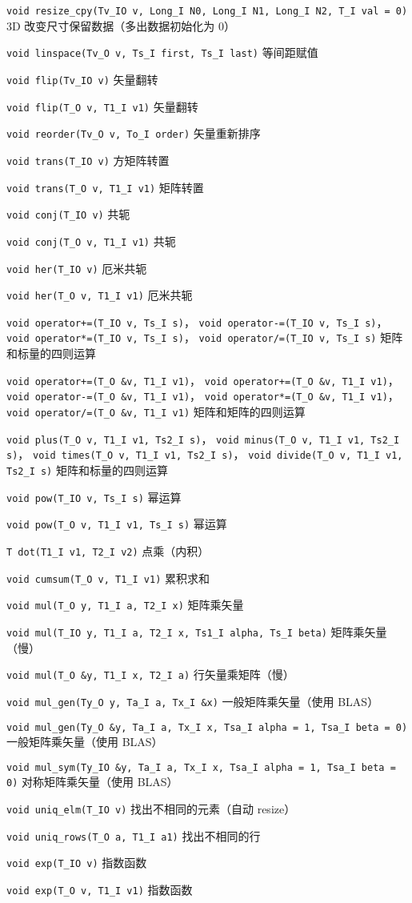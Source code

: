 \verb`void resize_cpy(Tv_IO v, Long_I N0, Long_I N1, Long_I N2, T_I val = 0)` 3D 改变尺寸保留数据（多出数据初始化为 0）

\verb`void linspace(Tv_O v, Ts_I first, Ts_I last)` 等间距赋值

\verb`void flip(Tv_IO v)` 矢量翻转

\verb`void flip(T_O v, T1_I v1)` 矢量翻转

\verb`void reorder(Tv_O v, To_I order)` 矢量重新排序

\verb`void trans(T_IO v)` 方矩阵转置

\verb`void trans(T_O v, T1_I v1)` 矩阵转置

\verb`void conj(T_IO v)` 共轭

\verb`void conj(T_O v, T1_I v1)` 共轭

\verb`void her(T_IO v)` 厄米共轭

\verb`void her(T_O v, T1_I v1)` 厄米共轭

\verb`void operator+=(T_IO v, Ts_I s)`， \verb`void operator-=(T_IO v, Ts_I s)`， \verb`void operator*=(T_IO v, Ts_I s)`， \verb`void operator/=(T_IO v, Ts_I s)` 矩阵和标量的四则运算

\verb`void operator+=(T_O &v, T1_I v1)`， \verb`void operator+=(T_O &v, T1_I v1)`， \verb`void operator-=(T_O &v, T1_I v1)`， \verb`void operator*=(T_O &v, T1_I v1)`， \verb`void operator/=(T_O &v, T1_I v1)` 矩阵和矩阵的四则运算

\verb`void plus(T_O v, T1_I v1, Ts2_I s)`， \verb`void minus(T_O v, T1_I v1, Ts2_I s)`， \verb`void times(T_O v, T1_I v1, Ts2_I s)`， \verb`void divide(T_O v, T1_I v1, Ts2_I s)` 矩阵和标量的四则运算

\verb`void pow(T_IO v, Ts_I s)` 幂运算

\verb`void pow(T_O v, T1_I v1, Ts_I s)` 幂运算

\verb`T dot(T1_I v1, T2_I v2)` 点乘（内积）

\verb`void cumsum(T_O v, T1_I v1)` 累积求和

\verb`void mul(T_O y, T1_I a, T2_I x)` 矩阵乘矢量

\verb`void mul(T_IO y, T1_I a, T2_I x, Ts1_I alpha, Ts_I beta)` 矩阵乘矢量（慢）

\verb`void mul(T_O &y, T1_I x, T2_I a)` 行矢量乘矩阵（慢）

\verb`void mul_gen(Ty_O y, Ta_I a, Tx_I &x)` 一般矩阵乘矢量（使用 BLAS）

\verb`void mul_gen(Ty_O &y, Ta_I a, Tx_I x, Tsa_I alpha = 1, Tsa_I beta = 0)` 一般矩阵乘矢量（使用 BLAS）

\verb`void mul_sym(Ty_IO &y, Ta_I a, Tx_I x, Tsa_I alpha = 1, Tsa_I beta = 0)` 对称矩阵乘矢量（使用 BLAS）

\verb`void uniq_elm(T_IO v)` 找出不相同的元素（自动 resize）

\verb`void uniq_rows(T_O a, T1_I a1)` 找出不相同的行

\verb`void exp(T_IO v)` 指数函数

\verb`void exp(T_O v, T1_I v1)` 指数函数
